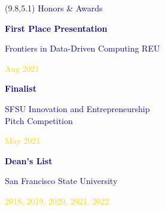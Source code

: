 \documentclass[hidelinks, 10pt]{article}
\begin{document}
\begin{textblock}{4}(9.8,5.1)
	\setlength{\parindent}{0cm}
    \large{\textcolor{navy}{Honors \& Awards}}

	\vspace{4mm}

	\footnotesize\textcolor{navy}{\scriptsize\textbf{First Place Presentation}}

	\vspace{0.5mm}

	\footnotesize\textcolor{navy}{\scriptsize Frontiers in Data-Driven Computing
	REU}

	\vspace{0.5mm}

	\scriptsize\textcolor{gold}{\scriptsize Aug 2021}

	\vspace{4mm}

	\footnotesize\textcolor{navy}{\scriptsize\textbf{Finalist}}

	\vspace{0.5mm}

	\scriptsize\textcolor{navy}{\scriptsize SFSU Innovation and Entrepreneurship\\Pitch Competition}

	\vspace{0.5mm}

	\scriptsize\textcolor{gold}{\scriptsize May 2021}

	\vspace{4mm}

	\footnotesize\textcolor{navy}{\scriptsize\textbf{Dean's List}}

	\vspace{0.5mm}

	\scriptsize\textcolor{navy}{\scriptsize San Francisco State University}

	\vspace{0.5mm}

	\scriptsize\textcolor{gold}{\scriptsize 2018, 2019, 2020, 2021, 2022}
\end{textblock}
\end{document}
